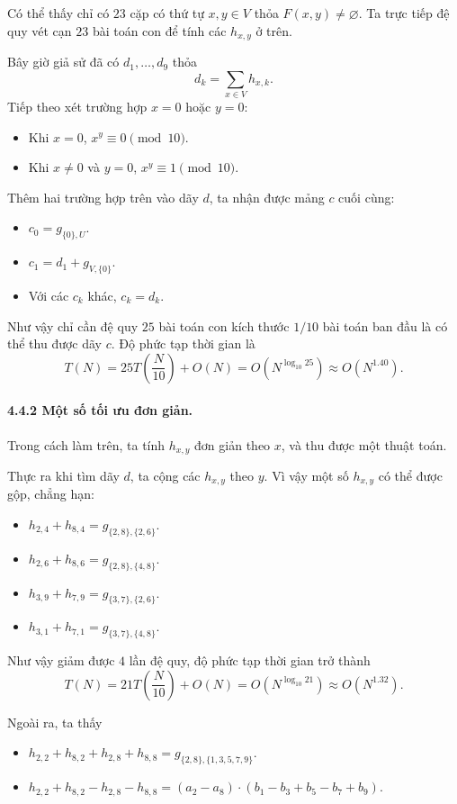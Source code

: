 \documentclass[11pt]{article}
\begin{document}
Có thể thấy chỉ có \(23\) cặp có thứ tự \(x,y\in V\) thỏa
\(F(x,y)\ne\varnothing\). Ta trực tiếp đệ quy vét cạn \(23\) bài toán con để
tính các \(h_{x,y}\) ở trên.

Bây giờ giả sử đã có \(d_1,\ldots,d_9\) thỏa
\[
  d_k=\sum_{x\in V}h_{x,k}.
\]
Tiếp theo xét trường hợp \(x=0\) hoặc \(y=0\):
\begin{itemize}
  \item Khi \(x=0\), \(x^y\equiv 0\pmod {10}\).
  \item Khi \(x\ne 0\) và \(y=0\), \(x^y\equiv 1\pmod {10}\).
\end{itemize}

Thêm hai trường hợp trên vào dãy \(d\), ta nhận được mảng \(c\) cuối cùng:
\begin{itemize}
  \item \(c_0=g_{\{0\},U}\).
  \item \(c_1=d_1+g_{V,\{0\}}\).
  \item Với các \(c_k\) khác, \(c_k=d_k\).
\end{itemize}

Như vậy chỉ cần đệ quy \(25\) bài toán con kích thước \(1/10\) bài toán ban
đầu là có thể thu được dãy \(c\). Độ phức tạp thời gian là
\[
  T(N)=25T\left(\frac{N}{10}\right)+O(N)
  =
  O(N^{\log_{10}25})
  \approx O(N^{1.40}).
\]

\paragraph{4.4.2 Một số tối ưu đơn giản.}
Trong cách làm trên, ta tính \(h_{x,y}\) đơn giản theo \(x\), và thu được một
thuật toán.

Thực ra khi tìm dãy \(d\), ta cộng các \(h_{x,y}\) theo \(y\). Vì vậy một số
\(h_{x,y}\) có thể được gộp, chẳng hạn:
\begin{itemize}
  \item \(h_{2,4}+h_{8,4}=g_{\{2,8\},\{2,6\}}\).
  \item \(h_{2,6}+h_{8,6}=g_{\{2,8\},\{4,8\}}\).
  \item \(h_{3,9}+h_{7,9}=g_{\{3,7\},\{2,6\}}\).
  \item \(h_{3,1}+h_{7,1}=g_{\{3,7\},\{4,8\}}\).
\end{itemize}

Như vậy giảm được \(4\) lần đệ quy, độ phức tạp thời gian trở thành
\[
  T(N)=21T\left(\frac{N}{10}\right)+O(N)
  =
  O(N^{\log_{10}21})
  \approx O(N^{1.32}).
\]

Ngoài ra, ta thấy
\begin{itemize}
  \item \(h_{2,2}+h_{8,2}+h_{2,8}+h_{8,8}=g_{\{2,8\},\{1,3,5,7,9\}}\).
  \item \(h_{2,2}+h_{8,2}-h_{2,8}-h_{8,8}
  =(a_2-a_8)\cdot(b_1-b_3+b_5-b_7+b_9)\).
\end{itemize}
\end{document}
